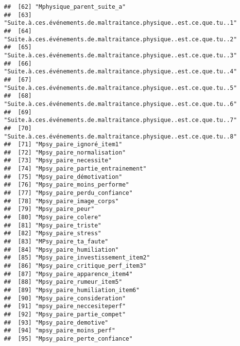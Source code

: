\documentclass[
]{article}
\begin{document}
\begin{verbatim}
##  [62] "Mphysique_parent_suite_a"                                          
##  [63] "Suite.à.ces.événements.de.maltraitance.physique..est.ce.que.tu..1" 
##  [64] "Suite.à.ces.événements.de.maltraitance.physique..est.ce.que.tu..2" 
##  [65] "Suite.à.ces.événements.de.maltraitance.physique..est.ce.que.tu..3" 
##  [66] "Suite.à.ces.événements.de.maltraitance.physique..est.ce.que.tu..4" 
##  [67] "Suite.à.ces.événements.de.maltraitance.physique..est.ce.que.tu..5" 
##  [68] "Suite.à.ces.événements.de.maltraitance.physique..est.ce.que.tu..6" 
##  [69] "Suite.à.ces.événements.de.maltraitance.physique..est.ce.que.tu..7" 
##  [70] "Suite.à.ces.événements.de.maltraitance.physique..est.ce.que.tu..8" 
##  [71] "Mpsy_paire_ignoré_item1"                                           
##  [72] "Mpsy_paire_normalisation"                                          
##  [73] "Mpsy_paire_necessite"                                              
##  [74] "Mpsy_paire_partie_entrainement"                                    
##  [75] "Mpsy_paire_démotivation"                                           
##  [76] "Mpsy_paire_moins_performe"                                         
##  [77] "Mpsy_paire_perdu_confiance"                                        
##  [78] "Mpsy_paire_image_corps"                                            
##  [79] "Mpsy_paire_peur"                                                   
##  [80] "Mpsy_paire_colere"                                                 
##  [81] "Mpsy_paire_triste"                                                 
##  [82] "Mpsy_paire_stress"                                                 
##  [83] "MPsy_paire_ta_faute"                                               
##  [84] "Mpsy_paire_humiliation"                                            
##  [85] "Mpsy_paire_investissement_item2"                                   
##  [86] "Mpsy_paire_critique_perf_item3"                                    
##  [87] "Mpsy_paire_apparence_item4"                                        
##  [88] "Mpsy_paire_rumeur_item5"                                           
##  [89] "Mpsy_paire_humiliation_item6"                                      
##  [90] "Mpsy_paire_consideration"                                          
##  [91] "mpsy_paire_neccesiteperf"                                          
##  [92] "Mpsy_paire_partie_compet"                                          
##  [93] "Mpsy_paire_demotive"                                               
##  [94] "mpsy_paire_moins_perf"                                             
##  [95] "Mpsy_paire_perte_confiance"                                        

\end{verbatim}
\end{document}
